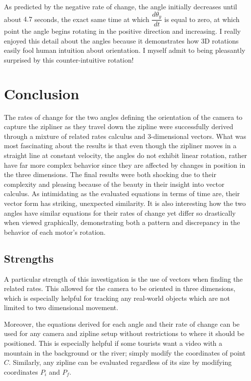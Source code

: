 \documentclass[12pt]{article}
\begin{document}
As predicted by the negative rate of change, the angle initially decreases until about $4.7$ seconds, the exact same time at which $\dfrac{d\theta_y}{dt}$ is equal to zero, at which point the angle begins rotating in the positive direction and increasing. I really enjoyed this detail about the angles because it demonstrates how 3D rotations easily fool human intuition about orientation. I myself admit to being pleasantly surprised by this counter-intuitive rotation! 


\section{Conclusion}
The rates of change for the two angles defining the orientation of the camera to capture the zipliner as they travel down the zipline were successfully derived through a mixture of related rates calculus and 3-dimensional vectors. What was most fascinating about the results is that even though the zipliner moves in a straight line at constant velocity, the angles do not exhibit linear rotation, rather have far more complex behavior since they are affected by changes in position in the three dimensions. The final results were both shocking due to their complexity and pleasing because of the beauty in their insight into vector calculus. As intimidating as the evaluated equations in terms of time are, their vector form has striking, unexpected similarity. It is also interesting how the two angles have similar equations for their rates of change yet differ so drastically when viewed graphically, demonstrating both a pattern and discrepancy in the behavior of each motor's rotation.
\subsection{Strengths}

A particular strength of this investigation is the use of vectors when finding the related rates. This allowed for the camera to be oriented in three dimensions, which is especially helpful for tracking any real-world objects which are not limited to two dimensional movement. 

Moreover, the equations derived for each angle and their rate of change can be used for any camera and zipline setup without restrictions to where it should be positioned. This is especially helpful if some tourists want a video with a mountain in the background or the river; simply modify the coordinates of point $C$. Similarly, any zipline can be evaluated regardless of its size by modifying coordinates $P_i$ and $P_f$. 
\end{document}
